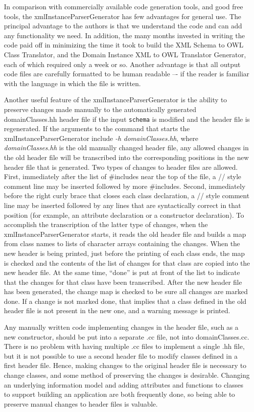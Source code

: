 \documentclass[preprint,12pt]{elsarticle}
\begin{document}
In comparison with commercially available code generation tools, and good
free tools, the xmlInstanceParserGenerator has few advantages for general
use. The principal advantage to the authors is that we understand the code
and can add any functionality we need. In addition, the many months
invested in writing the code paid off in minimizing the time it took to
build the XML Schema to OWL Class Translator, and the Domain Instance XML
to OWL Translator Generator, each of which required only a week or so.
Another advantage is that all output code files are carefully formatted to
be human readable –- if the reader is familiar with the language in which
the file is written.

Another useful feature of the xmlInstanceParserGenerator is the ability to
preserve changes made manually to the automatically generated
domainClasses.hh header file if the input {\tt schema} is modified and the
header file is regenerated. If the arguments to the command that starts the
xmlInstanceParserGenerator include {\em -h domainClasses.hh}, where {\em
  domainClasses.hh} is the old manually changed header file, any allowed
changes in the old header file will be transcribed into the corresponding
positions in the new header file that is generated. Two types of changes to
header files are allowed. First, immediately after the list of \#includes
near the top of the file, a // style comment line may be inserted followed
by more \#includes. Second, immediately before the right curly brace that
closes each class declaration, a // style comment line may be inserted
followed by any lines that are syntactically correct in that position (for
example, an attribute declaration or a constructor declaration). To
accomplish the transcription of the latter type of changes, when the
xmlInstanceParserGenerator starts, it reads the old header file and builds
a map from class names to lists of character arrays containing the changes.
When the new header is being printed, just before the printing of each
class ends, the map is checked and the contents of the list of changes for
that class are copied into the new header file. At the same time, ``done'' is
put at front of the list to indicate that the changes for that class have
been transcribed. After the new header file has been generated, the change
map is checked to be sure all changes are marked done. If a change is not
marked done, that implies that a class defined in the old header file is
not present in the new one, and a warning message is printed.

Any manually written code implementing changes in the header file,
such as a new constructor, should be put into a separate .cc file, not into
domainClasses.cc. There is no problem with having multiple .cc files to
implement a single .hh file, but it is not possible to use a second header
file to modify classes defined in a first header file. Hence, making
changes to the original header file is necessary to change classes, and
some method of preserving the changes is desirable. Changing an underlying
information model and adding attributes and functions to classes to support
building an application are both frequently done, so being able to preserve
manual changes to header files is valuable.
\end{document}
